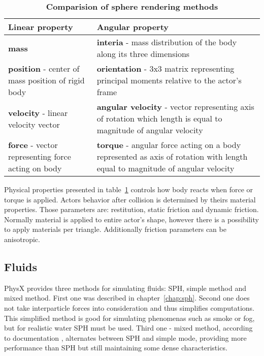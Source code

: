 \begin{table}[htdp]
\caption[Rigid body parameters]{\textbf{Comparision of sphere rendering methods}}
\centering
    \begin{tabular}{|p{6.5cm}|p{7cm}|}
        \hline
        {\bf Linear property } & {\bf Angular property } \\ \hline
       {\bf  mass }          & {\bf  interia } - mass distribution of the body along its three dimensions         \\ 
        {\bf  position } - center of mass position of rigid body       & {\bf  orientation } - 3x3 matrix representing  principal moments relative to the actor's frame     \\ 
        {\bf  velocity } - linear velocity vector      & {\bf  angular velocity } - vector representing axis of rotation which length is equal to magnitude of angular velocity \\ 
        {\bf  force } - vector representing force acting on body     & {\bf  torque } - angular force acting on a body represented as axis of rotation with length equal to magnitude of angular velocity          \\
        \hline
    \end{tabular}
\label{tab:rigid_body_properties}
\end{table}

Physical properties presented in table~\ref{tab:rigid_body_properties} controls how body reacts when force or torque is applied. Actors behavior after collision is determined by theirs material properties. Those parameters are: restitution, static friction and dynamic friction. Normally material is applied to entire actor's shape, however there is a possibility to apply materials per triangle. Additionally friction parameters can be anisotropic. 
\subsection{Fluids}
PhysX provides three methods for simulating fluids: SPH, simple method and mixed method. First one was described in chapter~\ref{chap:sph}. Second one does not take interparticle forces into consideration and thus simplifies computations. This simplified method is good for simulating phenomenas such as smoke or fog, but for realistic water SPH must be used. Third one - mixed method, according to documentation \cite{PhysXDoc}, alternates between SPH and simple mode, providing more performance than SPH but still maintaining some dense characteristics.

